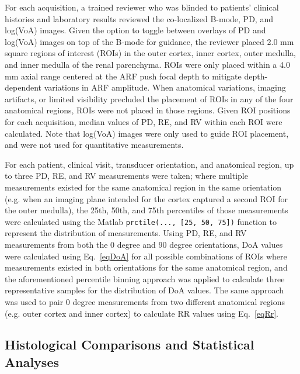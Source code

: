 For each acquisition, a trained reviewer who was blinded to patients' clinical histories and laboratory results reviewed the co-localized B-mode, PD, and log(VoA) images. Given the option to toggle between overlays of PD and log(VoA) images on top of the B-mode for guidance, the reviewer placed 2.0 mm square regions of interest (ROIs) in the outer cortex, inner cortex, outer medulla, and inner medulla of the renal parenchyma. ROIs were only placed within a 4.0 mm axial range centered at the ARF push focal depth to mitigate depth-dependent variations in ARF amplitude. When anatomical variations, imaging artifacts, or limited visibility precluded the placement of ROIs in any of the four anatomical regions, ROIs were not placed in those regions. Given ROI positions for each acquisition, median values of PD, RE, and RV within each ROI were calculated. Note that log(VoA) images were only used to guide ROI placement, and were not used for quantitative measurements.

For each patient, clinical visit, transducer orientation, and anatomical region, up to three PD, RE, and RV measurements were taken; where multiple measurements existed for the same anatomical region in the same orientation (e.g. when an imaging plane intended for the cortex captured a second ROI for the outer medulla), the 25th, 50th, and 75th percentiles of those measurements were calculated using the Matlab \texttt{prctile(..., [25, 50, 75])} function to represent the distribution of measurements. Using PD, RE, and RV measurements from both the 0 degree and 90 degree orientations, DoA values were calculated using Eq.~\eqref{eqDoA} for all possible combinations of ROIs where measurements existed in both orientations for the same anatomical region, and the aforementioned percentile binning approach was applied to calculate three representative samples for the distribution of DoA values. The same approach was used to pair 0 degree measurements from two different anatomical regions (e.g. outer cortex and inner cortex) to calculate RR values using Eq.~\eqref{eqRr}.

\subsection{Histological Comparisons and Statistical Analyses}

